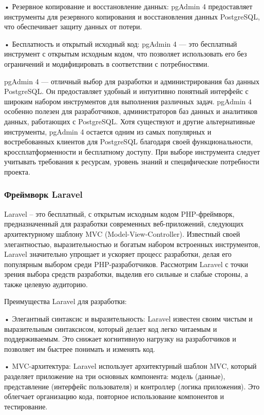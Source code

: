 •	Резервное копирование и восстановление данных: pgAdmin 4 предоставляет инструменты для резервного копирования и восстановления данных PostgreSQL, что обеспечивает защиту данных от потери.

•	Бесплатность и открытый исходный код: pgAdmin 4 — это бесплатный инструмент с открытым исходным кодом, что позволяет использовать его без ограничений и модифицировать в соответствии с потребностями.

pgAdmin 4 — отличный выбор для разработки и администрирования баз данных PostgreSQL. Он предоставляет удобный и интуитивно понятный интерфейс с широким набором инструментов для выполнения различных задач. pgAdmin 4 особенно полезен для разработчиков, администраторов баз данных и аналитиков данных, работающих с PostgreSQL. Хотя существуют и другие альтернативные инструменты, pgAdmin 4 остается одним из самых популярных и востребованных клиентов для PostgreSQL благодаря своей функциональности, кроссплатформенности и бесплатному доступу. При выборе инструмента следует учитывать требования к ресурсам, уровень знаний и специфические потребности проекта.


\subsubsection{Фреймворк Laravel}

Laravel – это бесплатный, с открытым исходным кодом PHP-фреймворк, предназначенный для разработки современных веб-приложений, следующих архитектурному шаблону MVC (Model-View-Controller). Известный своей элегантностью, выразительностью и богатым набором встроенных инструментов, Laravel значительно упрощает и ускоряет процесс разработки, делая его популярным выбором среди PHP-разработчиков. Рассмотрим Laravel с точки зрения выбора средств разработки, выделив его сильные и слабые стороны, а также целевую аудиторию.

Преимущества Laravel для разработки:

•	Элегантный синтаксис и выразительность: Laravel известен своим чистым и выразительным синтаксисом, который делает код легко читаемым и поддерживаемым. Это снижает когнитивную нагрузку на разработчиков и позволяет им быстрее понимать и изменять код.

•	MVC-архитектура: Laravel использует архитектурный шаблон MVC, который разделяет приложение на три основных компонента: модель (данные), представление (интерфейс пользователя) и контроллер (логика приложения). Это облегчает организацию кода, повторное использование компонентов и тестирование.

